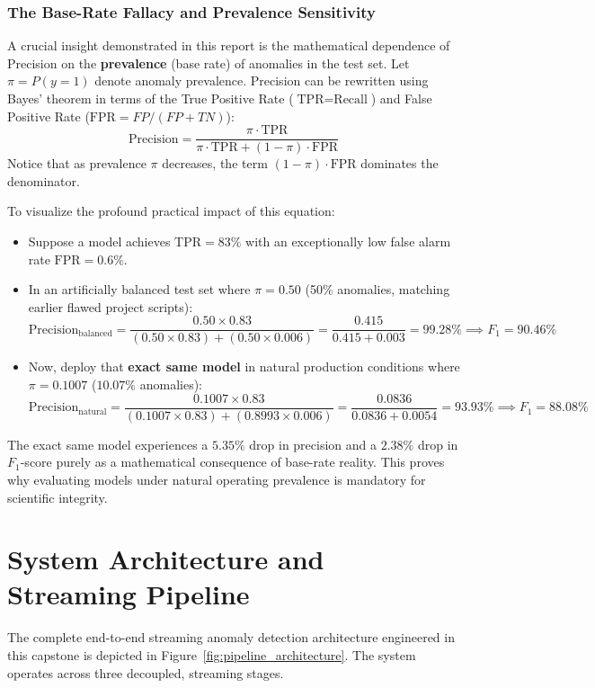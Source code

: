 \subsubsection{The Base-Rate Fallacy and Prevalence Sensitivity}
A crucial insight demonstrated in this report is the mathematical dependence of Precision on the \textbf{prevalence} (base rate) of anomalies in the test set. Let $\pi = P(y=1)$ denote anomaly prevalence. Precision can be rewritten using Bayes' theorem in terms of the True Positive Rate ($\text{TPR} = \text{Recall}$) and False Positive Rate ($\text{FPR} = FP / (FP + TN)$):
\begin{equation}
    \text{Precision} = \frac{\pi \cdot \text{TPR}}{\pi \cdot \text{TPR} + (1 - \pi) \cdot \text{FPR}}
\end{equation}
Notice that as prevalence $\pi$ decreases, the term $(1 - \pi) \cdot \text{FPR}$ dominates the denominator. 

To visualize the profound practical impact of this equation:
\begin{itemize}
    \item Suppose a model achieves $\text{TPR} = 83\%$ with an exceptionally low false alarm rate $\text{FPR} = 0.6\%$.
    \item In an artificially balanced test set where $\pi = 0.50$ (50\% anomalies, matching earlier flawed project scripts):
    \begin{equation}
        \text{Precision}_{\text{balanced}} = \frac{0.50 \times 0.83}{(0.50 \times 0.83) + (0.50 \times 0.006)} = \frac{0.415}{0.415 + 0.003} = \mathbf{99.28\%} \implies F_1 = \mathbf{90.46\%}
    \end{equation}
    \item Now, deploy that \textbf{exact same model} in natural production conditions where $\pi = 0.1007$ ($10.07\%$ anomalies):
    \begin{equation}
        \text{Precision}_{\text{natural}} = \frac{0.1007 \times 0.83}{(0.1007 \times 0.83) + (0.8993 \times 0.006)} = \frac{0.0836}{0.0836 + 0.0054} = \mathbf{93.93\%} \implies F_1 = \mathbf{88.08\%}
    \end{equation}
\end{itemize}
The exact same model experiences a $5.35\%$ drop in precision and a $2.38\%$ drop in $F_1$-score purely as a mathematical consequence of base-rate reality. This proves why evaluating models under natural operating prevalence is mandatory for scientific integrity.

\section{System Architecture and Streaming Pipeline}
\label{sec:sys_arch_pipeline}
The complete end-to-end streaming anomaly detection architecture engineered in this capstone is depicted in Figure~\ref{fig:pipeline_architecture}. The system operates across three decoupled, streaming stages.

